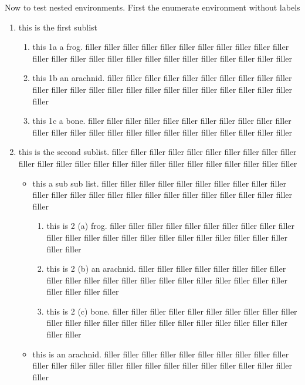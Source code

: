 ﻿\documentclass{article}
\begin{document}
Now to test nested environments.  First the enumerate 
environment without labels
\begin{enumerate}
\item this is the first sublist
   \begin{enumerate}
   \item this 1a a frog. filler filler filler filler filler filler filler filler filler filler filler filler filler filler filler filler filler filler filler filler filler filler filler filler filler 
   \item this 1b an arachnid. filler filler filler filler filler filler filler filler filler filler filler filler filler filler filler filler filler filler filler filler filler filler filler filler filler 
   \item this 1c a bone. filler filler filler filler filler filler filler filler filler filler filler filler filler filler filler filler filler filler filler filler filler filler filler filler filler 
   \end{enumerate}
\item this is the second sublist. filler filler filler filler filler filler filler filler filler filler filler filler filler filler filler filler filler filler filler filler filler filler filler filler filler 
   \begin{itemize}
   \item this a sub sub list. filler filler filler filler filler filler filler filler filler filler filler filler filler filler filler filler filler filler filler filler filler filler filler filler filler 
      \begin{enumerate}
      \item this is 2 (a) frog. filler filler filler filler filler filler filler filler filler filler filler filler filler filler filler filler filler filler filler filler filler filler filler filler filler 
      \item this is 2 (b) an arachnid. filler filler filler filler filler filler filler filler filler filler filler filler filler filler filler filler filler filler filler filler filler filler filler filler filler 
      \item this is 2 (c) bone. filler filler filler filler filler filler filler filler filler filler filler filler filler filler filler filler filler filler filler filler filler filler filler filler filler 
      \end{enumerate}
   \item this is an arachnid. filler filler filler filler filler filler filler filler filler filler filler filler filler filler filler filler filler filler filler filler filler filler filler filler filler 

\end{itemize}
\end{enumerate}
\end{document}
